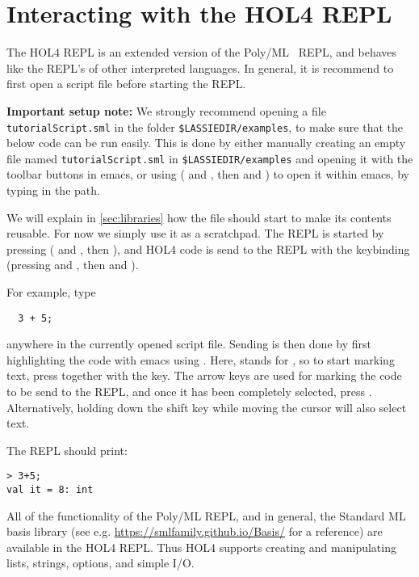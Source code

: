 \section{Interacting with the HOL4 REPL}

The HOL4 REPL is an extended version of the Poly/ML~\cite{polymlweb} REPL, and
behaves like the REPL's of other interpreted languages.
In general, it is recommend to first open a script file before starting
the REPL.

\textbf{Important setup note:} We strongly recommend opening a file
\texttt{tutorialScript.sml} in the folder \texttt{\$LASSIEDIR/examples}, to make
sure that the below code can be run easily.
This is done by either manually creating an empty file named \texttt{tutorialScript.sml} in \texttt{\$LASSIEDIR/examples}
and opening it with the toolbar buttons in emacs, or using  ( and , then  and )
to open it within emacs, by typing in the path.

We will explain in \autoref{sec:libraries} how the file should start to make its
contents reusable. For now we simply use it as a scratchpad.
The REPL is started by pressing  ( and , then ),
and HOL4 code is send to the REPL with the keybinding 
(pressing  and , then  and ).

For example, type
\begin{lstlisting}
  3 + 5;
\end{lstlisting}

anywhere in the currently opened script file.
Sending is then done by first highlighting the code with emacs using .
Here,  stands for , so to start marking text, press
 together with the  key.
The arrow keys are used for marking the code to be send to the REPL, and once it
has been completely selected, press .
Alternatively, holding down the shift key while moving the cursor will also select text.

The REPL should print:
\begin{lstlisting}[frame=single]
> 3+5;
val it = 8: int
\end{lstlisting}

All of the functionality of the Poly/ML REPL, and in general, the Standard ML
basis library (see e.g. \url{https://smlfamily.github.io/Basis/} for a reference)
are available in the HOL4 REPL.
Thus HOL4 supports creating and manipulating lists, strings, options, and
simple I/O.

